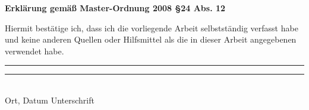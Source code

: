 \pagebreak
\begin{center}
\vspace{1cm}
\textbf{Erklärung gemäß Master-Ordnung 2008 §24 Abs. 12}
\vspace{1cm}

\end{center}

Hiermit bestätige ich, dass ich die vorliegende Arbeit selbstständig verfasst habe und keine anderen Quellen oder Hilfsmittel als die in dieser Arbeit angegebenen verwendet habe.\\
\vspace{2cm}


\rule{0.45\textwidth}{0.4pt}
\hspace{1cm} 
\rule{0.45\textwidth}{0.4pt} 
\\
Ort, Datum \hspace{6cm} Unterschrift
